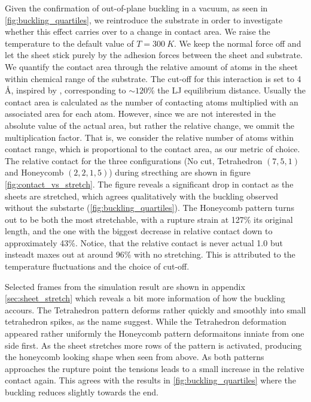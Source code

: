 Given the confirmation of out-of-plane buckling in a vacuum, as seen in
\cref{fig:buckling_quartiles}, we reintroduce the substrate in order to
investigate whether this effect carries over to a change in contact area. We
raise the temperature to the default value of $T =\SI{300}{K}$. We keep the
normal force off and let the sheet stick purely by the adhesion forces between
the sheet and substrate. We quantify the contact area through the relative
amount of atoms in the sheet within chemical range of the substrate. The cut-off
for this interaction is set to 4 Å, inspired by \cite{li_evolving_2016},
corresponding to $\sim 120$\% the LJ equilibrium distance. Usually the contact
area is calculated as the number of contacting atoms multiplied with an
associated area for each atom. However, since we are not interested in the
absolute value of the actual area, but rather the relative change, we ommit the
multiplication factor. That is, we consider the relative number of atoms within
contact range, which is proportional to the contact area, as our metric of
choice. The relative contact for the three configurations (No cut, Tetrahedron
$(7,5,1)$ and Honeycomb $(2,2,1,5)$) during strecthing are shown in figure
\cref{fig:contact_vs_stretch}. The figure reveals a significant drop in contact
as the sheets are stretched, which agrees qualitatively with the buckling
observed without the substarte (\cref{fig:buckling_quartiles}). The Honeycomb
pattern turns out to be both the most stretchable, with a rupture strain at
127\% its original length, and the one with the biggest decrease in relative
contact down to approximately 43\%. Notice, that the relative contact is never actual 1.0 but insteadt maxes out at around 96\% with no stretching. This is attributed to the temperature fluctuations and the choice of cut-off.

Selected frames from the simulation result
are shown in appendix \cref{sec:sheet_stretch} which reveals a bit more
information of how the buckling accours. The Tetrahedron pattern deforms rather quickly and smoothly into small tetrahedron spikes, as the name suggest. While the Tetrahedron deformation appeared rather uniformly the Honeycomb pattern deformaitons inniate from one side first. As the sheet stretches more rows of the pattern is activated, producing the honeycomb looking shape when seen from above. As both patterns approaches the rupture point the tensions leads to a small increase in the relative contact again. This agrees with the results in \cref{fig:buckling_quartiles} where the buckling reduces slightly towards the end.



